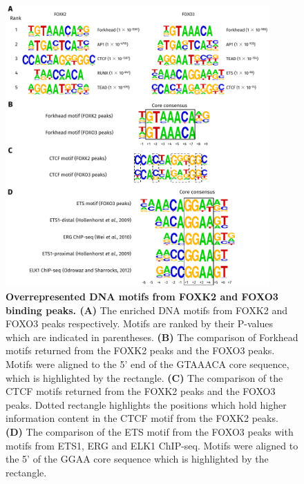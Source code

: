 \begin{figure}[!h]
    \centering
    \includegraphics[width=0.9\textwidth]{chapter3/figures_foxo3/fig44.pdf}
    \caption[Overrepresented DNA motifs from FOXK2 and FOXO3 binding peaks]{\textbf{Overrepresented DNA motifs from FOXK2 and FOXO3 binding peaks. (A)} The enriched DNA motifs from FOXK2 and FOXO3 peaks respectively. Motifs are ranked by their P-values which are indicated in parentheses. \textbf{(B)} The comparison of Forkhead motifs returned from the FOXK2 peaks and the FOXO3 peaks. Motifs were aligned to the 5' end of the GTAAACA core sequence, which is highlighted by the rectangle. \textbf{(C)} The comparison of the CTCF motifs returned from the FOXK2 peaks and the FOXO3 peaks. Dotted rectangle highlights the positions which hold higher information content in the CTCF motif from the FOXK2 peaks. \textbf{(D)} The comparison of the ETS motif from the FOXO3 peaks with motifs from ETS1, ERG and ELK1 ChIP-seq. Motifs were aligned to the 5' of the GGAA core sequence which is highlighted by the rectangle.}
    \label{fig:fig44}
\end{figure}

